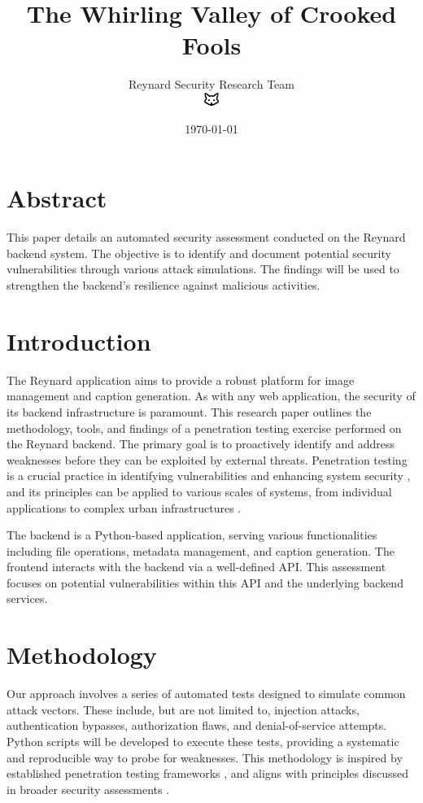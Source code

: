 \documentclass{article}
\title{The Whirling Valley of Crooked Fools}
\author{Reynard Security Research Team \\ \includegraphics[width=0.5cm]{../shared-assets/favicon.pdf}}
\date{\today}
\begin{document}
\maketitle

\section*{Abstract}
This paper details an automated security assessment conducted on the Reynard backend system. The objective is to identify and document potential security vulnerabilities through various attack simulations. The findings will be used to strengthen the backend's resilience against malicious activities.

\section{Introduction}
The Reynard application aims to provide a robust platform for image management and caption generation. As with any web application, the security of its backend infrastructure is paramount. This research paper outlines the methodology, tools, and findings of a penetration testing exercise performed on the Reynard backend. The primary goal is to proactively identify and address weaknesses before they can be exploited by external threats. Penetration testing is a crucial practice in identifying vulnerabilities and enhancing system security \cite{Phong2014, Altulaihan2023}, and its principles can be applied to various scales of systems, from individual applications to complex urban infrastructures \cite{Conti2015}.

The backend is a Python-based application, serving various functionalities including file operations, metadata management, and caption generation. The frontend interacts with the backend via a well-defined API. This assessment focuses on potential vulnerabilities within this API and the underlying backend services.

\section{Methodology}
Our approach involves a series of automated tests designed to simulate common attack vectors. These include, but are not limited to, injection attacks, authentication bypasses, authorization flaws, and denial-of-service attempts. Python scripts will be developed to execute these tests, providing a systematic and reproducible way to probe for weaknesses. This methodology is inspired by established penetration testing frameworks \cite{Wai2001}, and aligns with principles discussed in broader security assessments \cite{Phong2014}.
\end{document}

